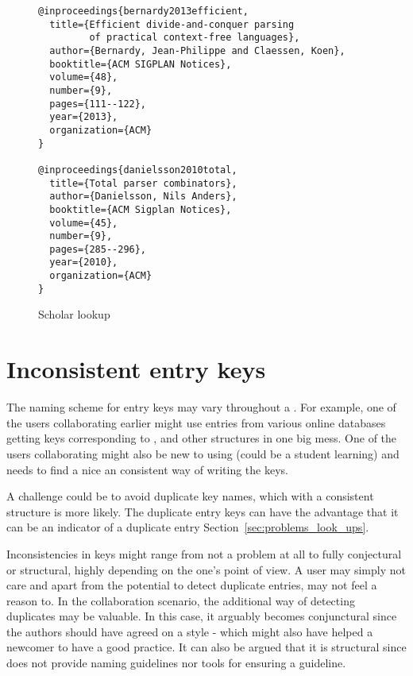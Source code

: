 \begin{figure}
  \centering
\begin{verbatim}
@inproceedings{bernardy2013efficient,
  title={Efficient divide-and-conquer parsing
         of practical context-free languages},
  author={Bernardy, Jean-Philippe and Claessen, Koen},
  booktitle={ACM SIGPLAN Notices},
  volume={48},
  number={9},
  pages={111--122},
  year={2013},
  organization={ACM}
}

@inproceedings{danielsson2010total,
  title={Total parser combinators},
  author={Danielsson, Nils Anders},
  booktitle={ACM Sigplan Notices},
  volume={45},
  number={9},
  pages={285--296},
  year={2010},
  organization={ACM}
}
\end{verbatim}
  \caption{Scholar lookup}
\label{fig:missing_org_scholar_lookup}
\end{figure}

\section{Inconsistent entry keys}
\label{sec:problems_inconsistent_keys}

The naming scheme for entry keys may vary throughout a .
For example, one of the users collaborating earlier might use entries
from various online databases getting keys corresponding to
,  and
other structures in one big mess.  One of the users collaborating
might also be new to using {\bibtex} (could be a student learning) and
needs to find a nice an consistent way of writing the keys.

A challenge could be to avoid duplicate key names, which with a
consistent structure is more likely.  The duplicate entry keys can
have the advantage that it can be an indicator of a duplicate entry
Section~\ref{sec:problems_look_ups}.

Inconsistencies in keys might range from not a problem at all to fully
conjectural or structural, highly depending on the one's point of
view.  A user may simply not care and apart from the potential to
detect duplicate entries, may not feel a reason to.  In the
collaboration scenario, the additional way of detecting duplicates may
be valuable.  In this case, it arguably becomes conjunctural since the
authors should have agreed on a style - which might also have helped a
newcomer to have a good practice.  It can also be argued that it is
structural since {\bibtex} does not provide naming guidelines nor
tools for ensuring a guideline.

